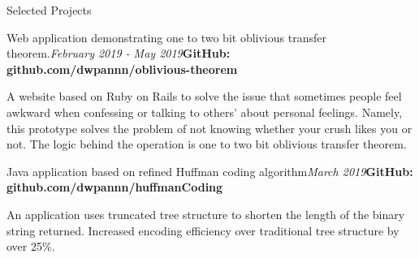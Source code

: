 \documentclass{resume}
\begin{document}
\begin{rSection}{Selected Projects}


\begin{rSubsection}{Web application demonstrating one to two bit oblivious transfer theorem.}{\em February 2019 - May 2019}{\textbf{GitHub: github.com/dwpannn/oblivious-theorem}}{}
\item A website based on Ruby on Rails to solve the issue that sometimes people feel awkward when confessing or talking to others' about personal feelings. Namely, this prototype solves the problem of not knowing whether your crush likes you or not. The logic behind the operation is one to two bit oblivious transfer theorem. 
\end{rSubsection}


\begin{rSubsection}{Java application based on refined Huffman coding algorithm}{\em March 2019}{\textbf{GitHub: github.com/dwpannn/huffmanCoding}}{}
\item An application uses truncated tree structure to shorten the length of the binary string returned. Increased encoding efficiency over traditional tree structure by over 25\%.
\end{rSubsection}
\end{rSection}
\end{document}
